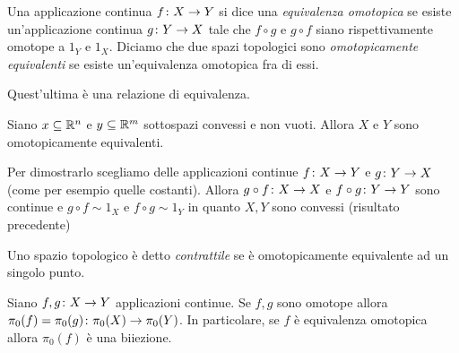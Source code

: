 \documentclass[a4paper]{article}
\begin{document}
\begin{snippetdefinition}{}
    Una applicazione continua \(f \colon X \to Y\)
    si dice una \emph{equivalenza omotopica}
    se esiste un'applicazione continua \(g \colon Y \to X\)
    tale che \(f \circ g\) e \(g \circ f\)
    siano rispettivamente omotope a \(1_Y\) e \(1_X\).
    Diciamo che due spazi topologici sono \emph{omotopicamente equivalenti}
    se esiste un'equivalenza omotopica fra di essi.
\end{snippetdefinition}

Quest'ultima è una relazione di equivalenza.

\begin{snippetexample}{}
    Siano \(x \subseteq \mathbb{R}^n\)
    e \(y \subseteq \mathbb{R}^m\)
    sottospazi convessi e non vuoti.
    Allora \(X\) e \(Y\) sono omotopicamente equivalenti.

    Per dimostrarlo scegliamo delle applicazioni continue
    \(f \colon X \to Y\) e \(g \colon Y \to X\)
    (come per esempio quelle costanti).
    Allora \(g\circ f \colon X \to X\)
    e \(f\circ g \colon Y \to Y\)
    sono continue e \(g \circ f \sim 1_X\)
    e \(f \circ g \sim 1_Y\)
    in quanto \(X, Y\) sono convessi (risultato precedente)
\end{snippetexample}

\begin{snippetdefinition}{}
    Uno spazio topologico è detto \emph{contrattile}
    se è omotopicamente equivalente ad un singolo punto.
\end{snippetdefinition}

\begin{snippetlemma}{}
    Siano \(f, g \colon X \to Y\)
    applicazioni continue.
    Se \(f,g\) sono omotope allora
    \(\pi_0(f) = \pi_0(g) \colon \pi_0(X) \to \pi_0(Y)\).
    In particolare, se \(f\) è equivalenza omotopica allora
    \(\pi_0(f)\) è una biiezione.
\end{snippetlemma}
\end{document}

